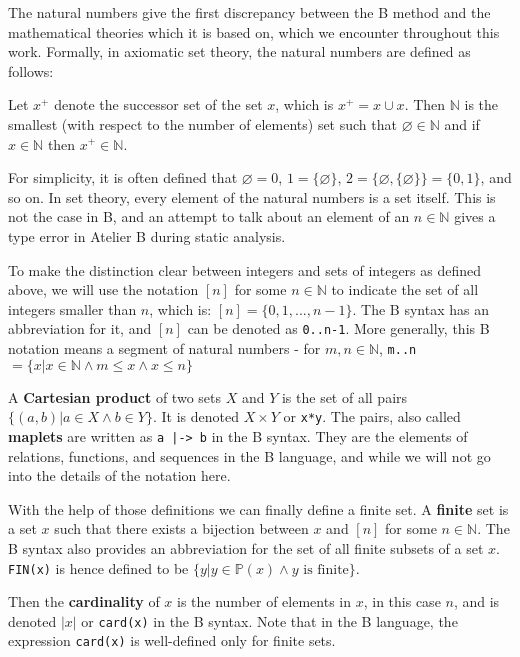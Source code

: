 \documentclass[11pt,journal]{IEEEtran}
\begin{document}
	The natural numbers give the first discrepancy between the B method and the mathematical theories which it is based on, which we encounter throughout this work. Formally, in axiomatic set theory, the natural numbers are defined as follows:
	
	Let $x^+$ denote the successor set of the set $x$, which is $x^+ = x \cup {x}$. Then $\mathbb{N}$ is the smallest (with respect to the number of elements) set such that $\varnothing \in \mathbb{N}$ and if $x \in \mathbb{N}$ then $x^+ \in \mathbb{N}$.
	
	For simplicity, it is often defined that $\varnothing = 0$, $1 = \{\varnothing \}$, $2 = \{\varnothing , \{\varnothing\} \} = \{0,1\}$, and so on. In set theory, every element of the natural numbers is a set itself. This is not the case in B, and an attempt to talk about an element of an $n \in \mathbb{N}$ gives a type error in Atelier B during static analysis.
	
	To make the distinction clear between integers and sets of integers as defined above, we will use the notation $[n]$ for some $n \in \mathbb{N}$ to indicate the set of all integers smaller than $n$, which is: $[n] = \{0,1, ...,n-1\}$. The B syntax has an abbreviation for it, and $[n]$ can be denoted as \texttt{0..n-1}. More generally, this B notation means a segment of natural numbers - for $m, n \in \mathbb{N}$, \texttt{m..n} $= \{x | x \in \mathbb{N} \wedge m \leq x \wedge x \leq n\}$
	
	A \textbf{Cartesian product} of two sets $X$ and $Y$ is the set of all pairs $\{(a,b) | a \in X \wedge b \in Y  \}$. It is denoted $X \times Y$ or \texttt{x*y}. The pairs, also called \textbf{maplets} are written as \texttt{a~|->~b} in the B syntax. They are the elements of relations, functions, and sequences in the B language, and while we will not go into the details of the notation here.
	
	With the help of those definitions we can finally define a finite set. A \textbf{finite} set is a set $x$ such that there exists a bijection between $x$ and $[n]$ for some $n \in \mathbb{N}$.  The B syntax also provides an abbreviation for the set of all finite subsets of a set $x$. \texttt{FIN(x)} is hence defined to be $\{y| y \in \mathbb{P}(x) \wedge y \text{ is finite} \}$.
	
	Then the \textbf{cardinality} of $x$ is the number of elements in $x$, in this case $n$, and is denoted $|x|$ or \texttt{card(x)} in the B syntax. Note that in the B language, the expression \texttt{card(x)} is well-defined only for finite sets.
	
\end{document}
